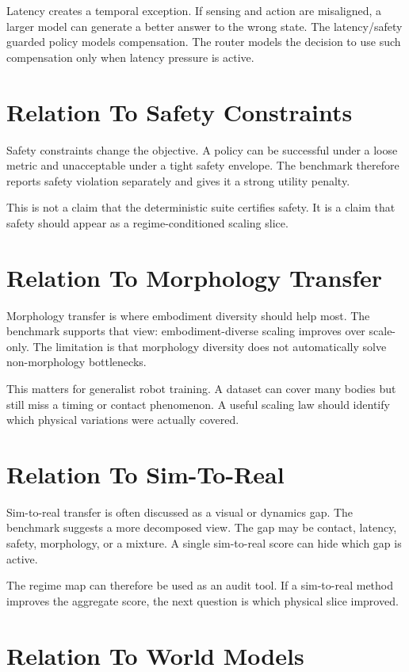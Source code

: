 Latency creates a temporal exception. If sensing and action are misaligned, a larger model can generate a better answer to the wrong state. The latency/safety guarded policy models compensation. The router models the decision to use such compensation only when latency pressure is active.

\section{Relation To Safety Constraints}

Safety constraints change the objective. A policy can be successful under a loose metric and unacceptable under a tight safety envelope. The benchmark therefore reports safety violation separately and gives it a strong utility penalty.

This is not a claim that the deterministic suite certifies safety. It is a claim that safety should appear as a regime-conditioned scaling slice.

\section{Relation To Morphology Transfer}

Morphology transfer is where embodiment diversity should help most. The benchmark supports that view: embodiment-diverse scaling improves over scale-only. The limitation is that morphology diversity does not automatically solve non-morphology bottlenecks.

This matters for generalist robot training. A dataset can cover many bodies but still miss a timing or contact phenomenon. A useful scaling law should identify which physical variations were actually covered.

\section{Relation To Sim-To-Real}

Sim-to-real transfer is often discussed as a visual or dynamics gap. The benchmark suggests a more decomposed view. The gap may be contact, latency, safety, morphology, or a mixture. A single sim-to-real score can hide which gap is active.

The regime map can therefore be used as an audit tool. If a sim-to-real method improves the aggregate score, the next question is which physical slice improved.

\section{Relation To World Models}

